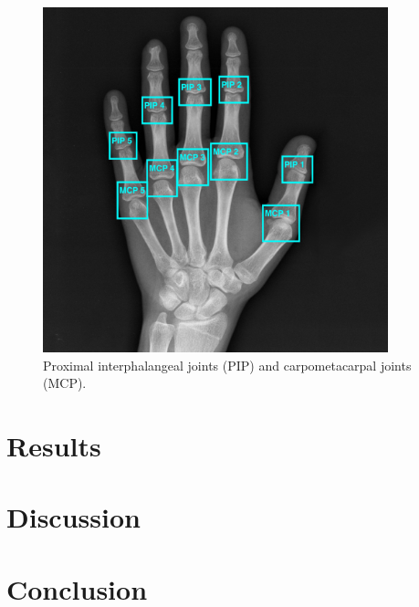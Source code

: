 \documentclass[12pt]{article}
\begin{document}
\begin{figure}
\includegraphics[width=10cm]{joints}	
\caption{Proximal interphalangeal joints (PIP) and carpometacarpal joints (MCP).}
\label{fig:joints}
\end{figure}


\section{Results}


\section{Discussion}


\section{Conclusion}



\newpage
\printbibliography

\newpage
\listoffigures
\end{document}
